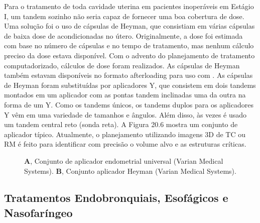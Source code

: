 \documentclass[11pt,a4paper]{article}
\begin{document}
	Para o tratamento de toda cavidade uterina em pacientes inoperáveis em Estágio I, um tandem sozinho não seria capaz de fornecer uma boa cobertura de dose. Uma solução foi o uso de cápsulas de Heyman, que consistiam em várias cápsulas de baixa dose de  acondicionadas no útero. Originalmente, a dose foi estimada com base no número de cápsulas e no tempo de tratamento, mas nenhum cálculo preciso da dose estava disponível. Com o advento do planejamento de tratamento computadorizado, cálculos de dose foram realizados. As cápsulas de Heyman também estavam disponíveis no formato afterloading para uso com . As cápsulas de Heyman foram substituídas por aplicadores Y, que consistem em dois tandems montados em um aplicador com as pontas tandem inclinadas uma da outra na forma de um Y. Como os tandems únicos, os tandems duplos para os aplicadores Y vêm em uma variedade de tamanhos e ângulos. Além disso, às vezes é usado um tandem central reto (sonda reta). A Figura 20.6 mostra um conjunto de aplicador típico. Atualmente, o planejamento utilizando imagens 3D de TC ou RM é feito para identificar com precisão o volume alvo e as estruturas críticas.

	\begin{figure}[h]
		\centering
		\caption{\textbf{A}, Conjunto de aplicador endometrial universal (Varian Medical Systems). \textbf{B}, Conjunto aplicador Heyman (Varian Medical Systems).}
		\label{fig:heyman}
	\end{figure}
	
\subsection{Tratamentos Endobronquiais, Esofágicos e Nasofaríngeo}
\end{document}
